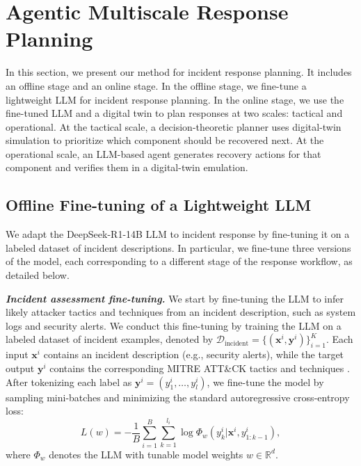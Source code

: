\documentclass[sigconf]{acmart}
\begin{document}
\section{Agentic Multiscale Response Planning}
In this section, we present our method for incident response planning. It includes an offline stage and an online stage. In the offline stage, we fine-tune a lightweight LLM for incident response planning. In the online stage, we use the fine-tuned LLM and a digital twin to plan responses at two scales: tactical and operational. At the tactical scale, a decision-theoretic planner uses digital-twin simulation to prioritize which component should be recovered next. At the operational scale, an LLM-based agent generates recovery actions for that component and verifies them in a digital-twin emulation. 

\subsection{Offline Fine-tuning of a Lightweight LLM}
We adapt the DeepSeek-R1-14B LLM to incident response by fine-tuning it on a labeled dataset of incident descriptions. In particular, we fine-tune three versions of the model, each corresponding to a different stage of the response workflow, as detailed below.


\vspace{2.5mm}
\noindent\textit{\textbf{Incident assessment fine-tuning.}}  We start by fine-tuning the LLM to infer likely attacker tactics and techniques from an incident description, such as system logs and security alerts. We conduct this fine-tuning by training the LLM on a labeled dataset of incident examples, denoted by $\mathcal{D}_{\text{incident}}=\{(\mathbf{x}^i, \mathbf{y}^i)\}_{i=1}^K$. Each input $\mathbf{x}^i$ contains an incident description (e.g., security alerts), while the target output $\mathbf{y}^i$ contains the corresponding MITRE ATT\&CK tactics and techniques \cite{mitre-attack}. After tokenizing each label as $\mathbf{y}^i = (y_1^i, \hdots, y^i_l)$, we fine-tune the model by sampling mini-batches and minimizing the standard autoregressive cross-entropy loss:
\begin{equation}
\label{eq:loss}
L(w)=-\frac{1}{B}\sum_{i=1}^B\sum_{k=1}^{l_i} \log \Phi_{w}(y_k^i|\mathbf{x}^i, y_{1:k-1}^{i}),
\end{equation}
where $\Phi_w$ denotes the LLM with tunable model weights $w\in \mathbb R^d$.
\end{document}

